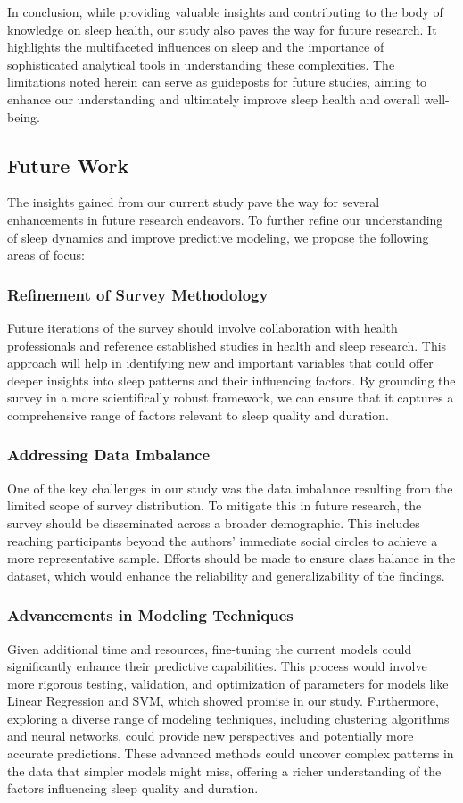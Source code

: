 \documentclass[conference]{IEEEtran}
\begin{document}
In conclusion, while providing valuable insights and contributing to the body of knowledge on sleep health, our study also paves the way for future research. It highlights the multifaceted influences on sleep and the importance of sophisticated analytical tools in understanding these complexities. The limitations noted herein can serve as guideposts for future studies, aiming to enhance our understanding and ultimately improve sleep health and overall well-being.


\subsection*{Future Work}

The insights gained from our current study pave the way for several enhancements in future research endeavors. To further refine our understanding of sleep dynamics and improve predictive modeling, we propose the following areas of focus:

\subsubsection*{Refinement of Survey Methodology}
Future iterations of the survey should involve collaboration with health professionals and reference established studies in health and sleep research. This approach will help in identifying new and important variables that could offer deeper insights into sleep patterns and their influencing factors. By grounding the survey in a more scientifically robust framework, we can ensure that it captures a comprehensive range of factors relevant to sleep quality and duration.

\subsubsection*{Addressing Data Imbalance}
One of the key challenges in our study was the data imbalance resulting from the limited scope of survey distribution. To mitigate this in future research, the survey should be disseminated across a broader demographic. This includes reaching participants beyond the authors' immediate social circles to achieve a more representative sample. Efforts should be made to ensure class balance in the dataset, which would enhance the reliability and generalizability of the findings.

\subsubsection*{Advancements in Modeling Techniques}
Given additional time and resources, fine-tuning the current models could significantly enhance their predictive capabilities. This process would involve more rigorous testing, validation, and optimization of parameters for models like Linear Regression and SVM, which showed promise in our study. Furthermore, exploring a diverse range of modeling techniques, including clustering algorithms and neural networks, could provide new perspectives and potentially more accurate predictions. These advanced methods could uncover complex patterns in the data that simpler models might miss, offering a richer understanding of the factors influencing sleep quality and duration.
\end{document}
